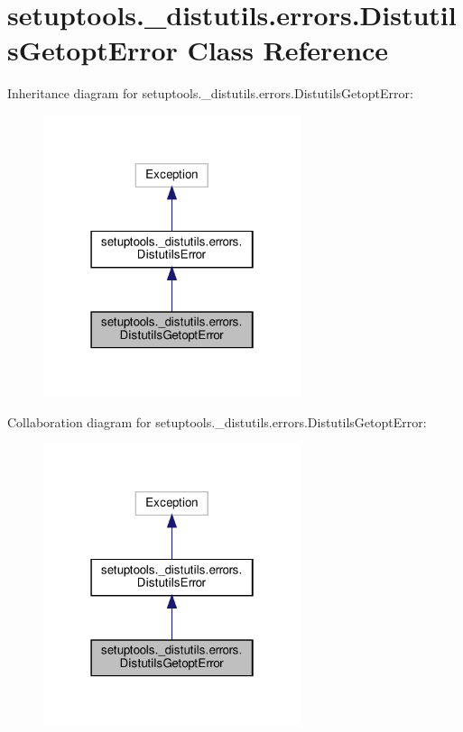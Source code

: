 \hypertarget{classsetuptools_1_1__distutils_1_1errors_1_1DistutilsGetoptError}{}\section{setuptools.\+\_\+distutils.\+errors.\+Distutils\+Getopt\+Error Class Reference}
\label{classsetuptools_1_1__distutils_1_1errors_1_1DistutilsGetoptError}


Inheritance diagram for setuptools.\+\_\+distutils.\+errors.\+Distutils\+Getopt\+Error\+:
\nopagebreak
\begin{figure}[H]
\begin{center}
\leavevmode
\includegraphics[width=214pt]{classsetuptools_1_1__distutils_1_1errors_1_1DistutilsGetoptError__inherit__graph}
\end{center}
\end{figure}


Collaboration diagram for setuptools.\+\_\+distutils.\+errors.\+Distutils\+Getopt\+Error\+:
\nopagebreak
\begin{figure}[H]
\begin{center}
\leavevmode
\includegraphics[width=214pt]{classsetuptools_1_1__distutils_1_1errors_1_1DistutilsGetoptError__coll__graph}
\end{center}
\end{figure}


